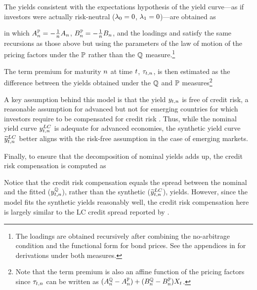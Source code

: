 {The yields consistent with the expectations hypothesis of the yield curve---as if investors were actually risk-neutral (\(\lambda_{0} = 0\), \(\lambda_{1} = 0 \))---are obtained as
	
\noindent in which \(A_{n}^{\mathbb{P}} = - \frac{1}{n} A_{n}\), \(B_{n}^{\mathbb{P}} = - \frac{1}{n} B_{n}\), and the loadings  \!and  \!satisfy the same recursions as those above but using the parameters of the law of motion of the pricing factors under the \(\mathbb{P}\) rather than the \(\mathbb{Q}\) measure.\footnote{ The loadings are obtained recursively after combining the no-arbitrage condition and the functional form for bond prices. See the appendices in \cite{Lloyd:2020} for derivations under both measures.} %

The term premium for maturity \(n\) at time \(t\), \(\tau_{t,n}\), is then estimated as the difference between the yields obtained under the \(\mathbb{Q}\) and \(\mathbb{P}\) measures\footnote{ Note that the term premium is also an affine function of the pricing factors since \(\tau_{t,n}\) can be written as \((A_{n}^{\mathbb{Q}} - A_{n}^{\mathbb{P}}) + (B_{n}^{\mathbb{Q}}  - B_{n}^{\mathbb{P}}) X_{t} \).}
	
A key assumption behind this model is that the yield \(y_{t,n}\) is free of credit risk, a reasonable assumption for advanced but not for emerging countries for which investors require to be compensated for credit risk \citep{DuSchreger:2016JoF,DuSchreger:2017WP}. 
Thus, %
while the nominal yield curve \(y_{t,n} ^{LC}\) is adequate for advanced economies, %
the synthetic yield curve \(\widetilde{y}_{t,n} ^{LC}\) better aligns with the risk-free assumption %
in the case of emerging markets.

Finally, to ensure that the decomposition of nominal yields adds up, %
the credit risk compensation is computed as
	
\noindent Notice that the credit risk compensation equals the spread between the nominal %
and the fitted (\(y_{t,n}^{\mathbb{Q}}\)), rather than the synthetic (\(\widetilde{y}_{t,n} ^{LC}\)), yields. However, since the model fits the synthetic yields reasonably well, the credit risk compensation here is largely similar to the LC credit spread reported by \cite{DuSchreger:2016JoF}.

}
